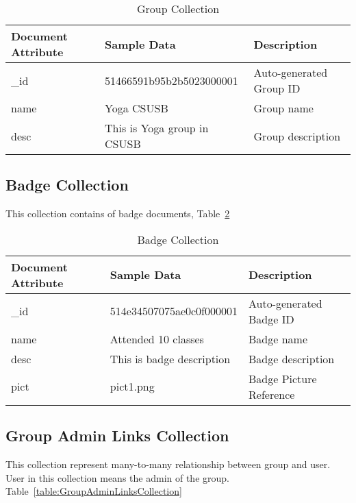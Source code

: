 \begin{table}[H]
\caption{Group Collection}\label{table:GroupCollection}
\textbf{ }
\begin{center}
\begin{tabular}{ | l | l |  l | }
\hline
Document Attribute & Sample Data & Description \\ \hline
{\_}id &  51466591b95b2b5023000001 & Auto-generated Group ID \\ \hline
name & Yoga CSUSB & Group name   \\ \hline
desc & This is Yoga group in CSUSB & Group description   \\ \hline
\end{tabular}
\end{center}
\end{table}


\subsection{Badge Collection}
This collection contains of badge documents,  Table~\ref{table:BadgeCollection}

\begin{table}[H]
\caption{Badge Collection}\label{table:BadgeCollection}
\textbf{ }
\begin{center}
\begin{tabular}{ | l | l |  l | }
\hline
Document Attribute & Sample Data & Description \\ \hline
{\_}id & 514e34507075ae0c0f000001 & Auto-generated Badge ID \\ \hline
name & Attended 10 classes & Badge name   \\ \hline
desc & This is badge description & Badge description   \\ \hline
pict & pict1.png & Badge Picture Reference   \\ \hline
\end{tabular}
\end{center}
\end{table}


\subsection{Group Admin Links Collection}
This collection represent many-to-many relationship between group and user. User in this collection means the admin of the group. Table~\ref{table:GroupAdminLinksCollection}

